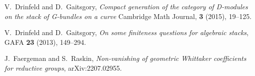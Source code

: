 \documentclass[9pt]{amsart}
\theoremstyle{remark}
\theoremstyle{definition}
\theoremstyle{remark}
\numberwithin{equation}{section}
\begin{document}
\begin{thebibliography}{99}



 V.~Drinfeld and D.~Gaitsgory, {\it Compact generation of the category of D-modules on the stack of G-bundles on a curve}
Cambridge Math Journal, {\bf 3} (2015), 19--125. 

 V.~Drinfeld and D.~Gaitsgory, {\it On some finiteness questions for algebraic stacks},
GAFA {\bf 23} (2013), 149--294.

 J.~Faergeman and S.~Raskin, {\it Non-vanishing of geometric Whittaker coefficients for reductive groups}, \newline
arXiv:2207.02955.











\end{thebibliography}
\end{document}

